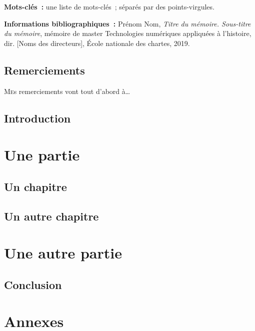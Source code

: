\documentclass[a4paper,12pt,twoside]{book}
\begin{document}
	\textbf{Mots-clés~:} une liste de mots-clés~; séparés par des points-virgules.
	
	\textbf{Informations bibliographiques~:} Prénom Nom, \textit{Titre du mémoire. Sous-titre du mémoire}, mémoire de master \og{}Technologies numériques appliquées à l'histoire\fg{}, dir. [Noms des directeurs], École nationale des chartes, 2019.
	
	\chapter*{Remerciements}
	
	\lettrine{M}es remerciements vont tout d'abord à\dots
	
	
	\chapter*{Introduction}
	
	\thispagestyle{empty}
	\cleardoublepage
	
	\mainmatter
	
	\part{Une partie}
	
	\chapter{Un chapitre}
	\chapter{Un autre chapitre}
	
	\part{Une autre partie}
	
	
	
	\chapter*{Conclusion}
	
	\appendix
	\part*{Annexes}	
	
	\backmatter


	\tableofcontents
	
\end{document}
